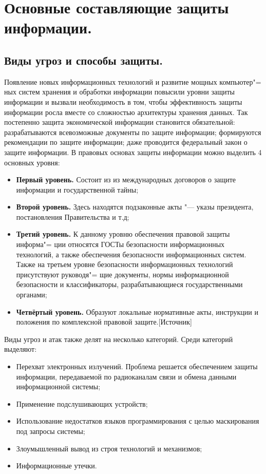 \section{Основные составляющие защиты информации.}
\subsection{Виды угроз и способы защиты.}
Появление новых информационных технологий и развитие мощных компьютер"=
ных систем хранения и обработки информации повысили уровни защиты информации и вызвали 
необходимость в том, чтобы эффективность защиты информации росла вместе со сложностью архитектуры хранения данных. Так постепенно защита экономической информации 
становится обязательной: разрабатываются всевозможные документы по защите информации; формируются рекомендации по защите информации; даже проводится федеральный закон 
о защите информации. В правовых основах защиты информации можно выделить 4 основных уровня:
\begin{itemize}
    \item \textbf{Первый уровень.} Состоит из из международных договоров о защите информации и государственной тайны;
    \item \textbf{Второй уровень.} Здесь находятся подзаконные акты "--- указы президента, постановления Правительства и т.д;
    \item \textbf{Третий уровень.} К данному уровню обеспечения правовой защиты информа"=
    ции относятся ГОСТы безопасности информационных технологий, а также обеспечения безопасности информационных систем.
    Также на третьем уровне безопасности информационных технологий присутствуют руководя"=
    щие документы, нормы информационной безопасности и классификаторы, разрабатывающиеся 
    государственными органами;
    \item \textbf{Четвёртый уровень.} Образуют локальные нормативные акты, инструкции и положения по комплексной правовой защите.[Источник] 
\end{itemize}
Виды угроз и атак также делят на несколько категорий. Среди категорий выделяют:
\begin{itemize}
    \item Перехват электронных излучений. Проблема решается обеспечением защиты информации, передаваемой по радиоканалам связи и обмена данными 
    информационной системы;
    \item Применение подслушивающих устройств;
    \item Использование недостатков языков программирования с целью маскирования под запросы системы;
    \item Злоумышленный вывод из строя технологий и механизмов;
    \item Информационные утечки.
\end{itemize}

